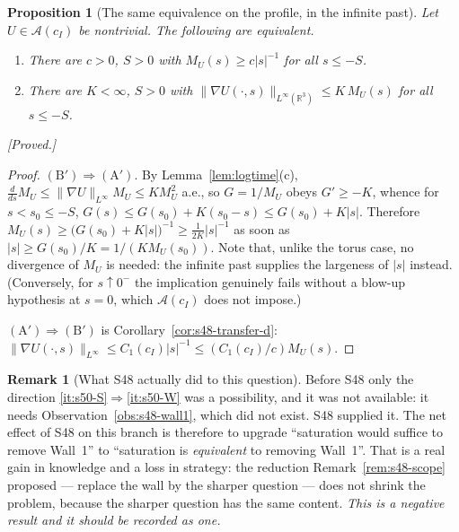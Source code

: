 \documentclass[11pt]{article}
\newtheorem{proposition}[theorem]{Proposition}
\theoremstyle{definition}
\newtheorem{remark}[theorem]{Remark}
\theoremstyle{remark}
\newcommand{\R}{\mathbb{R}}
\begin{document}
\begin{proposition}[The same equivalence on the profile, in the infinite past]
  \label{prop:s50-profile-equivalence}
  Let $U\in\mathcal{A}(c_I)$ be nontrivial. The following are equivalent.
  \begin{enumerate}[label=\textup{(\Alph*$'$)},leftmargin=2.9em]
  \item There are $c>0$, $S>0$ with $M_U(s)\geq c|s|^{-1}$ for all $s\leq-S$.
  \item There are $K<\infty$, $S>0$ with
    $\|\nabla U(\cdot,s)\|_{L^\infty(\R^3)}\leq K\,M_U(s)$ for all $s\leq-S$.
  \end{enumerate}
  \emph{[Proved.]}
\end{proposition}
\begin{proof}
  $(\mathrm{B}')\Rightarrow(\mathrm{A}')$. By Lemma~\ref{lem:logtime}(c),
  $\frac{d}{ds}M_U\leq\|\nabla U\|_{L^\infty}M_U\leq KM_U^2$ a.e., so
  $G=1/M_U$ obeys $G'\geq-K$, whence for $s<s_0\leq-S$,
  $G(s)\leq G(s_0)+K(s_0-s)\leq G(s_0)+K|s|$. Therefore
  $M_U(s)\geq\bigl(G(s_0)+K|s|\bigr)^{-1}\geq\tfrac1{2K}|s|^{-1}$ as soon as
  $|s|\geq G(s_0)/K=1/(KM_U(s_0))$. Note that, unlike the torus case, no
  divergence of $M_U$ is needed: the infinite past supplies the largeness of
  $|s|$ instead. (Conversely, for $s\uparrow0^-$ the implication genuinely
  fails without a blow-up hypothesis at $s=0$, which
  $\mathcal{A}(c_I)$ does not impose.)

  $(\mathrm{A}')\Rightarrow(\mathrm{B}')$ is
  Corollary~\ref{cor:s48-transfer-d}:
  $\|\nabla U(\cdot,s)\|_{L^\infty}\leq C_1(c_I)|s|^{-1}\leq
  (C_1(c_I)/c)M_U(s)$.
\end{proof}

\begin{remark}[What S48 actually did to this question]\label{rem:s50-s48-role}
  Before S48 only the direction \ref{it:s50-S}$\Rightarrow$\ref{it:s50-W} was
  a possibility, and it was not available: it needs
  Observation~\ref{obs:s48-wall1}, which did not exist. S48 supplied it. The
  net effect of S48 on this branch is therefore to upgrade ``saturation would
  suffice to remove Wall~1'' to ``saturation is \emph{equivalent} to removing
  Wall~1''. That is a real gain in knowledge and a loss in strategy: the
  reduction Remark~\ref{rem:s48-scope} proposed --- replace the wall by the
  sharper question --- does not shrink the problem, because the sharper
  question has the same content. \emph{This is a negative result and it should
  be recorded as one.}
\end{remark}
\end{document}
